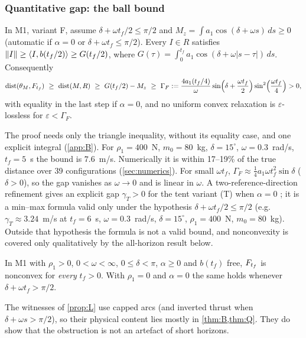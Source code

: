 \subsubsection*{Quantitative gap: the ball bound}
\begin{theorem}\label{thm:Q}
In M1, variant F, assume $\delta+\omega t_f/2\le\pi/2$ and $M_z=\int a_1\cos(\delta+\omega s)\,ds\ge0$ (automatic if $\alpha=0$
or $\delta+\omega t_f\le\pi/2$). Every $I\in R$ satisfies $\lVert I\rVert\ge\langle I,b(t_f/2)\rangle\ge G(t_f/2)$, where
$G(\tau)=\int_0^{t_f}a_1\cos(\delta+\omega|s-\tau|)\,ds$. Consequently
\[
\dist(\theta_M,\Ft)\ \ge\ \dist(M,R)\ \ge\ G(t_f/2)-M_z\ \ge\ \Gamma_F:=\frac{4a_1(t_f/4)}{\omega}\sin\!\Big(\delta+\frac{\omega t_f}{2}\Big)\sin^2\!\Big(\frac{\omega t_f}{4}\Big)>0,
\]
with equality in the last step if $\alpha=0$, and no uniform convex relaxation is $\varepsilon$-lossless for
$\varepsilon<\Gamma_F$.\Sproved
\end{theorem}
The proof needs only the triangle inequality, without its equality case, and one explicit integral (\cref{app:B}).
For $\rho_1=400$~N, $m_0=80$~kg, $\delta=15^\circ$, $\omega=0.3$~rad/s, $t_f=5$~s the bound is $7.6$~m/s. Numerically it is
within 17--19\% of the true distance over 39 configurations (\cref{sec:numerics}). For small $\omega t_f$,
$\Gamma_F\approx\tfrac14a_1\omega t_f^2\sin\delta$ ($\delta>0$), so the gap vanishes as $\omega\to0$ and is linear in $\omega$.
A two-reference-direction refinement gives an explicit gap $\gamma_T>0$ for the tent variant (T) when $\alpha=0$
; it is a min--max formula valid only under the hypothesis $\delta+\omega t_f/2\le\pi/2$ (e.g.\
$\gamma_T\approx3.24$~m/s at $t_f=6$~s, $\omega=0.3$~rad/s, $\delta=15^\circ$, $\rho_1=400$~N, $m_0=80$~kg). Outside that
hypothesis the formula is not a valid bound, and nonconvexity is covered only qualitatively by the all-horizon result below.

\begin{proposition}\label{prop:L}
In M1 with $\rho_1>0$, $0<\omega<\infty$, $0\le\delta<\pi$, $\alpha\ge0$ and $b(t_f)$ free, $F_{t_f}$ is nonconvex for
\emph{every} $t_f>0$. With $\rho_1=0$ and $\alpha=0$ the same holds whenever $\delta+\omega t_f>\pi/2$.\Sproved
\end{proposition}
The witnesses of \cref{prop:L} use capped arcs (and inverted thrust when $\delta+\omega s>\pi/2$), so their physical
content lies mostly in \cref{thm:B,thm:Q}. They do show that the obstruction is not an artefact of short horizons.

